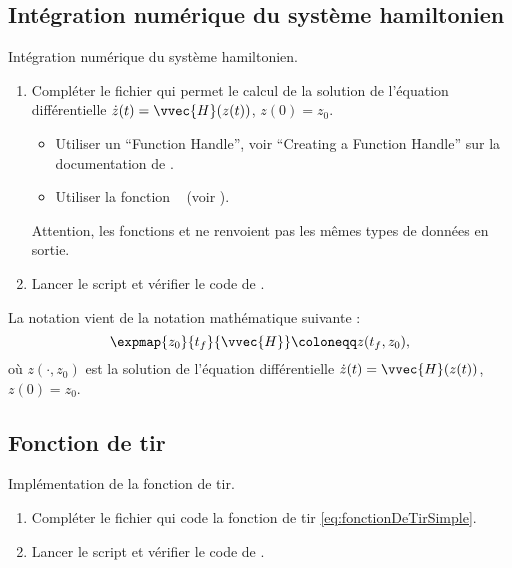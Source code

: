 \subsection{Int\'egration num\'erique du syst\`eme hamiltonien}

\begin{myExercice} Int\'egration num\'erique du syst\`eme hamiltonien.
\begin{enumerate}
    \item Compl\'eter le fichier  qui permet le calcul de la solution de l'\'equation diff\'erentielle
        $\dot{z}(t) = \vvec{H}(z(t))$, $z(0) = z_0$.
        \begin{itemize}
            \item Utiliser un ``Function Handle'', voir ``Creating a Function Handle'' sur la documentation de \matlab.
            \item Utiliser la fonction \matlab\  (voir ).
        \end{itemize}
        Attention, les fonctions  et  ne renvoient pas les m\^emes types de donn\'ees en sortie.
    \item Lancer le script  et v\'erifier le code de .
\end{enumerate}
\end{myExercice}

\begin{myremark}
    La notation  vient de la notation math\'ematique suivante :
    \[
        \expmap{z_0}{t_f}{\vvec{H}} \coloneqq z(t_f,z_0),
    \]
    o\`u $z(\cdot,z_0)$ est la solution de l'\'equation diff\'erentielle $\dot{z}(t) = \vvec{H}(z(t))$, $z(0) = z_0$.
\end{myremark}

\subsection{Fonction de tir}

\begin{myExercice} Impl\'ementation de la fonction de tir.
\begin{enumerate}
    \item Compl\'eter le fichier  qui code la fonction de tir \eqref{eq:fonctionDeTirSimple}.
    \item Lancer le script  et v\'erifier le code de .
\end{enumerate}
\end{myExercice}

